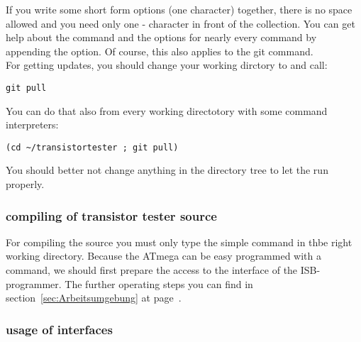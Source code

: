 If you write some short form options (one character) together, there is no space allowed
and you need only one - character in front of the collection.
You can get help about the command and the options for nearly every command by appending
the  option.
Of course, this also applies to the git command.\\
For getting updates, you should change your working dirctory to  and call:
\begin{large} \vspace{-0.4em} \begin{verbatim}
git pull
\end{verbatim} \end{large}
You can do that also from every working directotory with some command interpreters:
\begin{large} \vspace{-0.4em} \begin{verbatim}
(cd ~/transistortester ; git pull)
\end{verbatim} \end{large}
You should better not change anything in the 
directory tree to let the  run properly.


\subsubsection{compiling of transistor tester source}
For compiling the source you must only type the simple command 
in thbe right working directory.
Because the ATmega can be easy programmed with a  command,
we should first prepare the access to the interface of the ISB-programmer.
The further operating steps you can find in section~\ref{sec:Arbeitsumgebung}
at page~\pageref{sec:Arbeitsumgebung}.

\subsubsection{usage of interfaces}
\label{sec:Schnittstellen}

